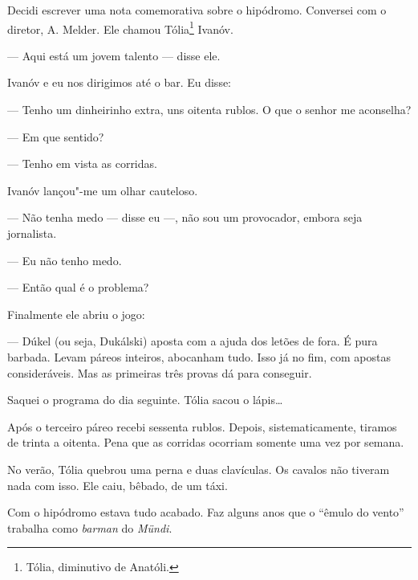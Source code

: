 Decidi escrever uma nota comemorativa sobre o hipódromo. Conversei com o
diretor, A. Melder. Ele chamou Tólia\footnote{Tólia, diminutivo de Anatóli.} Ivanóv.

--- Aqui está um jovem talento --- disse ele.

Ivanóv e eu nos dirigimos até o bar. Eu disse:

--- Tenho um dinheirinho extra, uns oitenta rublos. O que o senhor me
aconselha?

--- Em que sentido?

--- Tenho em vista as corridas.

Ivanóv lançou"-me um olhar cauteloso.

--- Não tenha medo --- disse eu ---, não sou um provocador, embora seja
jornalista.

--- Eu não tenho medo.

--- Então qual é o problema?

Finalmente ele abriu o jogo:

--- Dúkel (ou seja, Dukálski) aposta com a ajuda dos letões de fora. É
pura barbada. Levam páreos inteiros, abocanham tudo. Isso já no fim, com
apostas consideráveis. Mas as primeiras três provas dá para conseguir.

Saquei o programa do dia seguinte. Tólia sacou o lápis\ldots{}

Após o terceiro páreo recebi sessenta rublos. Depois, sistematicamente,
tiramos de trinta a oitenta. Pena que as corridas ocorriam somente uma
vez por semana.

No verão, Tólia quebrou uma perna e duas clavículas. Os cavalos não
tiveram nada com isso. Ele caiu, bêbado, de um táxi.

Com o hipódromo estava tudo acabado. Faz alguns anos que o ``êmulo do
vento'' trabalha como \emph{barman} do \emph{Mündi}.

\clearpage
\thispagestyle{empty}

\movetooddpage
\begin{center}
{}
\end{center}

